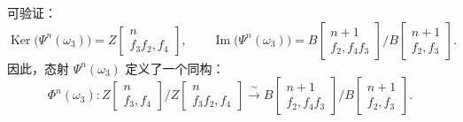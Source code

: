 \clearpage
{}%
\begingroup\small\setlength{\parskip}{0pt}\setlength{\emergencystretch}{2em}
可验证：
\[
\operatorname{Ker}\bigl(\Psi^n(\omega_3)\bigr)
=Z\!\begin{bmatrix}n\\ f_3f_2,f_4\end{bmatrix},
\qquad
\operatorname{Im}\bigl(\Psi^n(\omega_3)\bigr)
=B\!\begin{bmatrix}n+1\\ f_2,f_4f_3\end{bmatrix}
 \Big/
 B\!\begin{bmatrix}n+1\\ f_2,f_3\end{bmatrix}.
\]
因此，态射 $\Psi^n(\omega_3)$ 定义了一个同构：
\[
\Phi^n(\omega_3)\colon
Z\!\begin{bmatrix}n\\ f_3,f_4\end{bmatrix}
 \Big/
Z\!\begin{bmatrix}n\\ f_3f_2,f_4\end{bmatrix}
\xrightarrow{\ \sim\ }
B\!\begin{bmatrix}n+1\\ f_2,f_4f_3\end{bmatrix}
 \Big/
B\!\begin{bmatrix}n+1\\ f_2,f_3\end{bmatrix}.
\]


